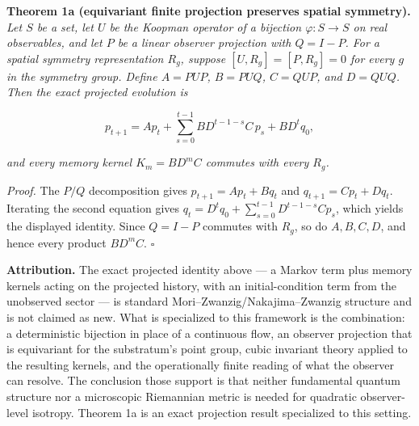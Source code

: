 \documentclass[
]{article}
\begin{document}
\textbf{Theorem 1a (equivariant finite projection preserves spatial
symmetry).} \emph{Let \(S\) be a set, let \(U\) be the Koopman operator
of a bijection \(\varphi:S\to S\) on real observables, and let \(P\) be
a linear observer projection with \(Q=I-P\). For a spatial symmetry
representation \(R_g\), suppose \([U,R_g]=[P,R_g]=0\) for every \(g\) in
the symmetry group. Define \(A=PUP\), \(B=PUQ\), \(C=QUP\), and
\(D=QUQ\). Then the exact projected evolution is}

\[p_{t+1}=A p_t+\sum_{s=0}^{t-1}BD^{t-1-s}C\,p_s+BD^tq_0,\]

\emph{and every memory kernel \(K_m=BD^mC\) commutes with every
\(R_g\).}

\emph{Proof.} The \(P/Q\) decomposition gives \(p_{t+1}=Ap_t+Bq_t\) and
\(q_{t+1}=Cp_t+Dq_t\). Iterating the second equation gives
\(q_t=D^tq_0+\sum_{s=0}^{t-1}D^{t-1-s}Cp_s\), which yields the displayed
identity. Since \(Q=I-P\) commutes with \(R_g\), so do \(A,B,C,D\), and
hence every product \(BD^mC\). \(\square\)

\textbf{Attribution.} The exact projected identity above --- a Markov
term plus memory kernels acting on the projected history, with an
initial-condition term from the unobserved sector --- is standard
Mori--Zwanzig/Nakajima--Zwanzig structure and is not claimed as new.
What is specialized to this framework is the combination: a
deterministic bijection in place of a continuous flow, an observer
projection that is equivariant for the substratum's point group, cubic
invariant theory applied to the resulting kernels, and the operationally
finite reading of what the observer can resolve. The conclusion those
support is that neither fundamental quantum structure nor a microscopic
Riemannian metric is needed for quadratic observer-level isotropy.
Theorem 1a is an exact projection result specialized to this setting.
\end{document}
